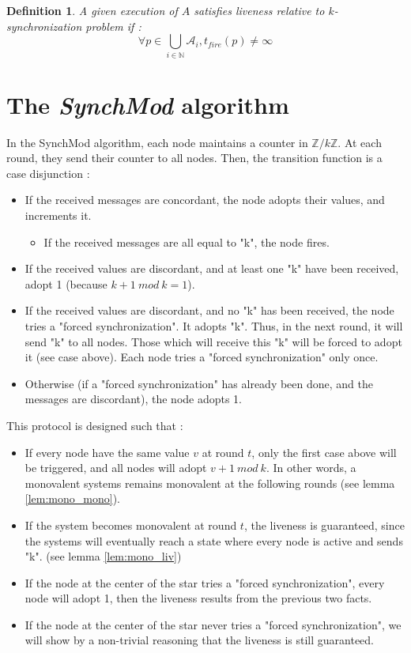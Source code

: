 \documentclass{article}
\newtheorem{definition}{Definition}
\begin{document}
\begin{definition}
	A given execution of $A$ satisfies liveness relative to $k$-synchronization problem if :
	$$\forall p \in \bigcup\limits_{i \in \mathds{N}} \mathcal{A}_i, t_{fire}(p) \neq \infty$$
\end{definition}

\section{The \textit{SynchMod} algorithm}

In the SynchMod algorithm, each node maintains a counter in $\mathds{Z}/k\mathds{Z}$. At each round,
they send their counter to all nodes.
Then, the transition function is a case disjunction :
\begin{itemize}
	\item If the received messages are concordant, the node adopts their values, and increments it.
		\begin{itemize}
			\item If the received messages are all equal to "k", the node fires.
		\end{itemize}
	\item If the received values are discordant, and at least one "k" have been received, adopt 1 (because $k+1~mod~k = 1$).
	\item If the received values are discordant, and no "k" has been received, the node tries a "forced synchronization". It adopts "k".
		Thus, in the next round, it will send "k" to all nodes. Those which will receive this "k" will be forced to adopt it (see case above).
		Each node tries a "forced synchronization" only once.
	\item Otherwise (if a "forced synchronization" has already been done, and the messages are discordant), the node adopts 1.
\end{itemize}

\noindent This protocol is designed such that :
\begin{itemize}
	\item If every node have the same value $v$ at round $t$, only the first case above will be triggered, and all nodes will adopt $v+1~mod~k$.
		In other words, a monovalent systems remains monovalent at the following rounds (see lemma \ref{lem:mono_mono}).
	\item If the system becomes monovalent at round $t$, the liveness is guaranteed, since the systems will eventually reach a state where every node is active and sends "k".
		(see lemma \ref{lem:mono_liv})
	\item If the node at the center of the star tries a "forced synchronization", every node will adopt 1, then the liveness results from the previous two facts.
	\item If the node at the center of the star never tries a "forced synchronization", we will show by a non-trivial reasoning that the liveness is still guaranteed.
\end{itemize}
\end{document}
